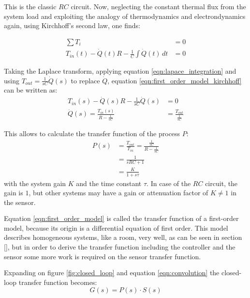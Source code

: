 \begin{figure}[hb]
    \centering
\end{figure}

This is the classic $RC$ circuit. Now, neglecting the constant thermal flux from the system load and exploiting the analogy of thermodynamics and electrondynamics again, using Kirchhoff's second law, one finds:

\begin{align}
    \sum T_i &= 0 \nonumber\\
    T_{in}(t) - \dot{Q}(t) R - \frac 1 C \int \dot{Q}(t)\,dt &= 0 \label{eqn:first_order_model_kirchhoff}
\end{align}

Taking the Laplace transform, applying equation \ref{eqn:lapace_integration} and using $T_{out} = \frac{1}{sC} \dot Q(s)$ to replace $\dot Q$, equation \ref{eqn:first_order_model_kirchhoff} can be written as:
\begin{align*}
    T_{in}(s) - \dot{Q}(s) R - \frac{1}{sC} \dot{Q}(s) &= 0\\
    \dot{Q}(s) = \frac{T_{in}(s)}{R-\frac{1}{sC}} &= \frac{T_{out}}{\frac{1}{sC}}
\end{align*}

This allows to calculate the transfer function of the process $P$:
\begin{align}
    P(s) &= \frac{T_{out}}{T_{in}} = \frac{\frac{1}{sC}}{R-\frac{1}{sC}} \nonumber\\
    &= \frac{1}{sRC + 1} \nonumber\\
    &= \frac{K}{1 + s\tau} \label{eqn:first_order_model}
\end{align}
with the system gain $K$ and the time constant $\tau$. In case of the $RC$ circuit, the gain is $1$, but other systems may have a gain or attenuation factor of $K \neq 1$ in the sensor.

Equation \ref{eqn:first_order_model} is called the transfer function of a first-order model, because its origin is a differential equation of first order. This model describes homogeneous systems, like a room, very well, as can be seen in section \ref{}, but in order to derive the transfer function including the controller and the sensor some more work is required on the sensor transfer function.

Expanding on figure \ref{fig:closed_loop} and equation \ref{eqn:convolution} the closed-loop transfer function becomes:
\begin{equation}
    G(s) = P(s) \cdot S(s)
\end{equation}

